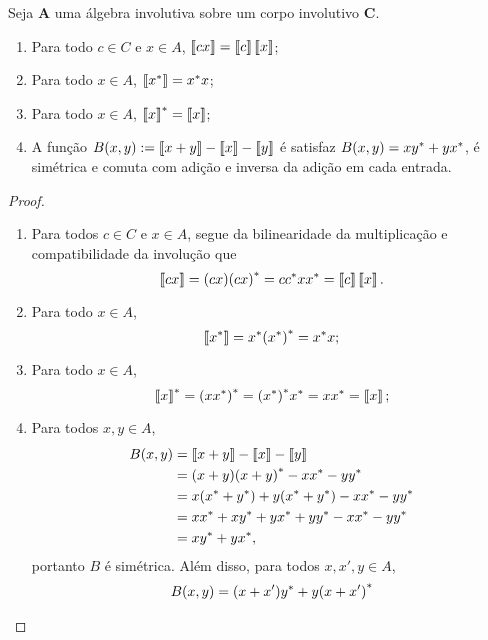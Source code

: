 \begin{proposition}
Seja $\bm A$ uma álgebra involutiva sobre um corpo involutivo $\bm C$.
	\begin{enumerate}
	\item Para todo $c \in C$ e $x \in A$, $\left\llbracket{cx}\right\rrbracket = \left\llbracket{c}\right\rrbracket\left\llbracket{x}\right\rrbracket$;
	\item Para todo $x \in A$, $ \left\llbracket{{x}^{\ast}}\right\rrbracket = {x}^{\ast}x$;
	\item Para todo $x \in A$, $ {\left\llbracket{x}\right\rrbracket}^{\ast} = \left\llbracket{x}\right\rrbracket$;
	\item A função $B(x,y) := \left\llbracket{x+y}\right\rrbracket-\left\llbracket{x}\right\rrbracket-\left\llbracket{y}\right\rrbracket$ é satisfaz $B(x,y) = x{y}^{\ast} + y{x}^{\ast}$, é simétrica e comuta com adição e inversa da adição em cada entrada.%
	\end{enumerate}
\end{proposition}
\begin{proof}
	\begin{enumerate}
	\item Para todos $c \in C$ e $x \in A$, segue da bilinearidade da multiplicação e compatibilidade da involução que
		\begin{equation*}
		\left\llbracket{cx}\right\rrbracket = (cx){(cx)}^{\ast} = c{c}^{\ast}x{x}^{\ast} = \left\llbracket{c}\right\rrbracket\left\llbracket{x}\right\rrbracket.
		\end{equation*}
	\item Para todo $x \in A$,
		\begin{equation*}
		\left\llbracket{{x}^{\ast}}\right\rrbracket = {x}^{\ast}{({x}^{\ast})}^{\ast} = {x}^{\ast}x;
		\end{equation*}
	\item Para todo $x \in A$,
		\begin{equation*}
		{\left\llbracket{x}\right\rrbracket}^{\ast} = {(x{x}^{\ast})}^{\ast} = {({x}^{\ast})}^{\ast}{x}^{\ast} = x{x}^{\ast} = \left\llbracket{x}\right\rrbracket;
		\end{equation*}
	\item Para todos $x,y \in A$,
		\begin{align*}
		B(x,y) &= \left\llbracket{x+y}\right\rrbracket-\left\llbracket{x}\right\rrbracket-\left\llbracket{y}\right\rrbracket \\
			&= (x+y){(x+y)}^{\ast} - x{x}^{\ast} - y{y}^{\ast} \\
			&= x({x}^{\ast}+{y}^{\ast}) + y({x}^{\ast}+{y}^{\ast}) - x{x}^{\ast} - y{y}^{\ast} \\
			&= x{x}^{\ast} + x{y}^{\ast} + y{x}^{\ast} + y{y}^{\ast} - x{x}^{\ast} - y{y}^{\ast} \\
			&= x{y}^{\ast} + y{x}^{\ast},
		\end{align*}
	portanto $B$ é simétrica. Além disso, para todos $x,x',y \in A$,
		\begin{align*}
		B(x,y) &= (x+x')\invol{y} + y\invol{(x+x')} \\

\end{align*}
\end{enumerate}
\end{proof}
